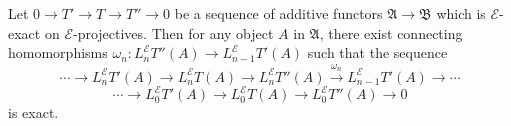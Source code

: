 Let $0 \to T' \to T \to T'' \to 0$ be a sequence of additive functors $\mathfrak{A} \to \mathfrak{B}$ which is $\mathcal{E}$-exact on $\mathcal{E}$-projectives. Then for any object $A$ in $\mathfrak{A}$, there exist connecting homomorphisms $\omega_n : L_n^{\mathcal{E}} T''(A) \to L_{n-1}^{\mathcal{E}} T'(A)$ such that the sequence
\[
\cdots \to L_n^{\mathcal{E}} T'(A) \to L_n^{\mathcal{E}} T(A) \to L_n^{\mathcal{E}} T''(A) \xrightarrow{\omega_n} L_{n-1}^{\mathcal{E}} T'(A) \to \cdots
\]
\[
\cdots \to L_0^{\mathcal{E}} T'(A) \to L_0^{\mathcal{E}} T(A) \to L_0^{\mathcal{E}} T''(A) \to 0
\]
is exact.
